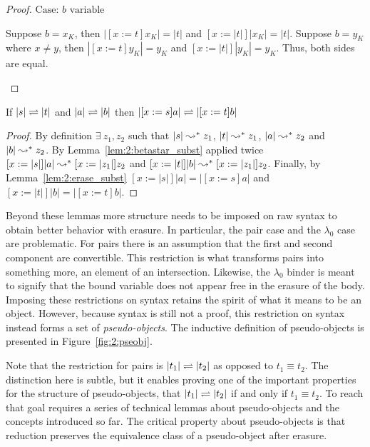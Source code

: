 \begin{proof}
    $\text{Case: }b \text{ variable}$
    \begin{proofcase}
        Suppose $b = x_K$, then $|[x := t]x_K| = |t|$ and $[x := |t|]|x_K| = |t|$.
        Suppose $b = y_K$ where $x \neq y$, then $|[x := t]y_K| = y_K$ and $[x := |t|]|y_K| = y_K$.
        Thus, both sides are equal.
    \end{proofcase}
\end{proof}

\begin{lemma}
    \label{lem:2:betaconv_erased_subst}
    If $|s| \rightleftharpoons |t|$ and $|a| \rightleftharpoons |b|$ then $|[x := s]a| \rightleftharpoons |[x := t]b|$
\end{lemma}
\begin{proof}
    By definition $\exists\ z_1, z_2$ such that $|s| \leadsto^* z_1$, $|t| \leadsto^* z_1$, $|a| \leadsto^* z_2$ and $|b| \leadsto^* z_2$.
    By Lemma~\ref{lem:2:betastar_subst} applied twice $[x := |s|]|a| \leadsto^* [x := |z_1|]z_2$ and $[x := |t|]|b| \leadsto^* [x := |z_1|]z_2$.
    Finally, by Lemma~\ref{lem:2:erase_subst} $[x := |s|]|a| = |[x := s]a|$ and $[x := |t|]|b| = |[x := t]b|$.
\end{proof}

Beyond these lemmas more structure needs to be imposed on raw syntax to obtain better behavior with erasure.
In particular, the pair case and the $\lambda_0$ case are problematic.
For pairs there is an assumption that the first and second component are convertible.
This restriction is what transforms pairs into something more, an element of an intersection.
Likewise, the $\lambda_0$ binder is meant to signify that the bound variable does not appear free in the erasure of the body.
Imposing these restrictions on syntax retains the spirit of what it means to be an object.
However, because syntax is still not a proof, this restriction on syntax instead forms a set of \textit{pseudo-objects}.
The inductive definition of pseudo-objects is presented in Figure~\ref{fig:2:pseobj}.



Note that the restriction for pairs is $|t_1| \rightleftharpoons |t_2|$ as opposed to $t_1 \equiv t_2$.
The distinction here is subtle, but it enables proving one of the important properties for the structure of pseudo-objects, that $|t_1| \rightleftharpoons |t_2|$ if and only if $t_1 \equiv t_2$.
To reach that goal requires a series of technical lemmas about pseudo-objects and the concepts introduced so far.
The critical property about pseudo-objects is that reduction preserves the equivalence class of a pseudo-object after erasure.

